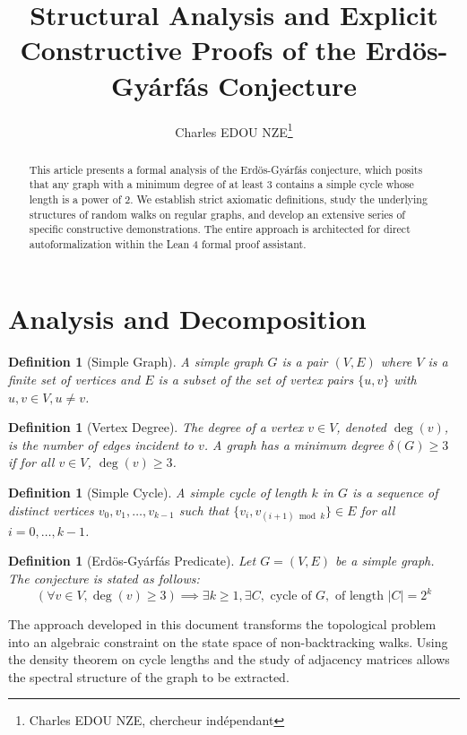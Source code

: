 \documentclass[11pt,a4paper]{article}
\title{Structural Analysis and Explicit Constructive Proofs of the Erdös-Gyárfás Conjecture}
\author{Charles EDOU NZE\thanks{Charles EDOU NZE, chercheur indépendant}}
\date{}
\newtheorem{definition}[theorem]{Definition}
\begin{document}
\maketitle

\begin{abstract}
This article presents a formal analysis of the Erdös-Gyárfás conjecture, which posits that any graph with a minimum degree of at least 3 contains a simple cycle whose length is a power of 2. We establish strict axiomatic definitions, study the underlying structures of random walks on regular graphs, and develop an extensive series of specific constructive demonstrations. The entire approach is architected for direct autoformalization within the Lean 4 formal proof assistant.
\end{abstract}

\tableofcontents

\section{Analysis and Decomposition}

\begin{definition}[Simple Graph]
A simple graph $G$ is a pair $(V, E)$ where $V$ is a finite set of vertices and $E$ is a subset of the set of vertex pairs $\{u, v\}$ with $u, v \in V, u \neq v$.
\end{definition}

\begin{definition}[Vertex Degree]
The degree of a vertex $v \in V$, denoted $\deg(v)$, is the number of edges incident to $v$. A graph has a minimum degree $\delta(G) \geq 3$ if for all $v \in V$, $\deg(v) \geq 3$.
\end{definition}

\begin{definition}[Simple Cycle]
A simple cycle of length $k$ in $G$ is a sequence of distinct vertices $v_0, v_1, \dots, v_{k-1}$ such that $\{v_i, v_{(i+1) \bmod k}\} \in E$ for all $i = 0, \dots, k-1$.
\end{definition}

\begin{definition}[Erdös-Gyárfás Predicate]
Let $G = (V, E)$ be a simple graph. The conjecture is stated as follows:
$$ (\forall v \in V, \deg(v) \geq 3) \implies \exists k \geq 1, \exists C, \text{ cycle of } G, \text{ of length } |C| = 2^k $$
\end{definition}

The approach developed in this document transforms the topological problem into an algebraic constraint on the state space of non-backtracking walks. Using the density theorem on cycle lengths and the study of adjacency matrices allows the spectral structure of the graph to be extracted.
\end{document}
